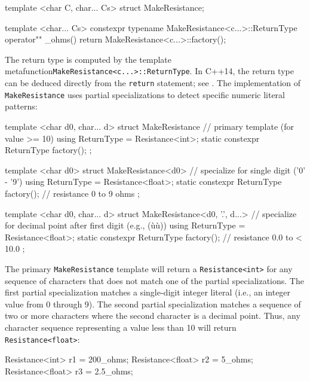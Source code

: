 \begin{emcppslisting}
template <char C, char... Cs> struct MakeResistance;

template <char... Cs>
constexpr typename MakeResistance<c...>::ReturnType
operator"" _ohms() { return MakeResistance<c...>::factory(); }
\end{emcppslisting}
    
\noindent The return type is computed by the template metafunction\linebreak[4]%
\lstinline!MakeResistance<c...>::ReturnType!. In C++14, the return type can
be deduced directly from the \lstinline!return! statement; see .
The implementation of \lstinline!MakeResistance! uses partial
specializations to detect specific numeric literal patterns:

\begin{emcppslisting}
template <char d0, char... d>
struct MakeResistance
{
    // primary template (for value >= 10)
    using ReturnType = Resistance<int>;
    static constexpr ReturnType factory();
};

template <char d0>
struct MakeResistance<d0>
{
    // specialize for single digit ('0' - '9')
    using ReturnType = Resistance<float>;
    static constexpr ReturnType factory(); // resistance 0 to 9 ohms
};

template <char d0, char... d>
struct MakeResistance<d0, '.', d...>
{
    // specialize for decimal point after first digit (e.g., (ù{}ù))
    using ReturnType = Resistance<float>;
    static constexpr ReturnType factory(); // resistance 0.0 to < 10.0
};
\end{emcppslisting}
    
\noindent The primary \lstinline!MakeResistance! template will return a
\lstinline!Resistance<int>! for any sequence of characters that does not
match one of the partial specializations. The first partial
specialization matches a single-digit integer literal (i.e., an integer
value from 0 through 9). The second partial specialization matches a
sequence of two or more characters where the second character is a
decimal point. Thus, any character sequence representing a value less
than 10 will return \lstinline!Resistance<float>!:

\begin{emcppslisting}
Resistance<int>   r1 = 200_ohms;
Resistance<float> r2 = 5_ohms;
Resistance<float> r3 = 2.5_ohms;
\end{emcppslisting}
    
